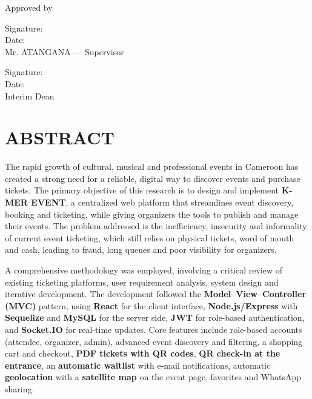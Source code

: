 \documentclass[12pt,a4paper]{report}
\begin{document}
\vspace{1cm}
\noindent Approved by

\vspace{0.8cm}
\noindent Signature: \underline{\hspace{6cm}}\\[4pt]
Date: \underline{\hspace{6cm}}\\
Mr. ATANGANA --- Supervisor

\vspace{1.2cm}
\noindent Signature: \underline{\hspace{6cm}}\\[4pt]
Date: \underline{\hspace{6cm}}\\
Interim Dean

\chapter*{ABSTRACT}
The rapid growth of cultural, musical and professional events in Cameroon has created a
strong need for a reliable, digital way to discover events and purchase tickets. The
primary objective of this research is to design and implement \textbf{K-MER EVENT}, a
centralized web platform that streamlines event discovery, booking and ticketing, while
giving organizers the tools to publish and manage their events. The problem addressed is
the inefficiency, insecurity and informality of current event ticketing, which still
relies on physical tickets, word of mouth and cash, leading to fraud, long queues and poor
visibility for organizers.

A comprehensive methodology was employed, involving a critical review of existing ticketing
platforms, user requirement analysis, system design and iterative development. The
development followed the \textbf{Model--View--Controller (MVC)} pattern, using
\textbf{React} for the client interface, \textbf{Node.js/Express} with \textbf{Sequelize}
and \textbf{MySQL} for the server side, \textbf{JWT} for role-based authentication, and
\textbf{Socket.IO} for real-time updates. Core features include role-based accounts
(attendee, organizer, admin), advanced event discovery and filtering, a shopping cart and
checkout, \textbf{PDF tickets with QR codes}, \textbf{QR check-in at the entrance}, an
\textbf{automatic waitlist} with e-mail notifications, automatic \textbf{geolocation} with a
\textbf{satellite map} on the event page, favorites and WhatsApp sharing.
\end{document}
